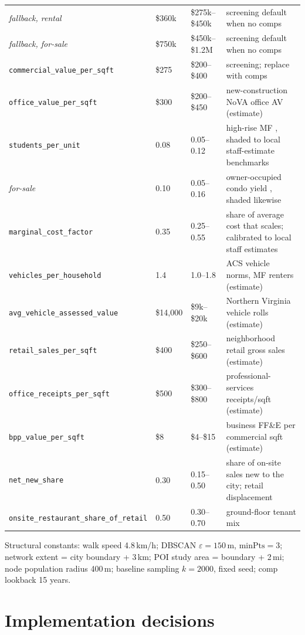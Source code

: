 \documentclass[11pt]{article}
\newcommand{\assum}[1]{\texttt{#1}}
\begin{document}
\begin{center}
\begin{tabular}{@{}llll@{}}
\quad\emph{fallback, rental} & \$360k & \$275k--\$450k & screening default when no comps \\
\quad\emph{fallback, for-sale} & \$750k & \$450k--\$1.2M & screening default when no comps \\
\assum{commercial\_value\_per\_sqft} & \$275 & \$200--\$400 & screening; replace with comps \\
\assum{office\_value\_per\_sqft} & \$300 & \$200--\$450 & new-construction NoVA office AV (estimate) \\
\assum{students\_per\_unit} & 0.08 & 0.05--0.12 & high-rise MF \cite{listokin2006}, shaded to local staff-estimate benchmarks \\
\quad\emph{for-sale} & 0.10 & 0.05--0.16 & owner-occupied condo yield \cite{listokin2006}, shaded likewise \\
\assum{marginal\_cost\_factor} & 0.35 & 0.25--0.55 & share of average cost that scales; calibrated to local staff estimates \\
\assum{vehicles\_per\_household} & 1.4 & 1.0--1.8 & ACS vehicle norms, MF renters (estimate) \\
\assum{avg\_vehicle\_assessed\_value} & \$14{,}000 & \$9k--\$20k & Northern Virginia vehicle rolls (estimate) \\
\assum{retail\_sales\_per\_sqft} & \$400 & \$250--\$600 & neighborhood retail gross sales (estimate) \\
\assum{office\_receipts\_per\_sqft} & \$500 & \$300--\$800 & professional-services receipts/sqft (estimate) \\
\assum{bpp\_value\_per\_sqft} & \$8 & \$4--\$15 & business FF\&E per commercial sqft (estimate) \\
\assum{net\_new\_share} & 0.30 & 0.15--0.50 & share of on-site sales new to the city; retail displacement \\
\assum{onsite\_restaurant\_share\_of\_retail} & 0.50 & 0.30--0.70 & ground-floor tenant mix \\
\bottomrule
\end{tabular}
\end{center}

\noindent
Structural constants: walk speed 4.8\,km/h; DBSCAN $\varepsilon=150$\,m,
$\mathrm{minPts}=3$; network extent = city boundary + 3\,km; POI study area =
boundary + 2\,mi; node population radius 400\,m; baseline sampling $k = 2000$,
fixed seed; comp lookback 15 years.

\section{Implementation decisions}
\end{document}
